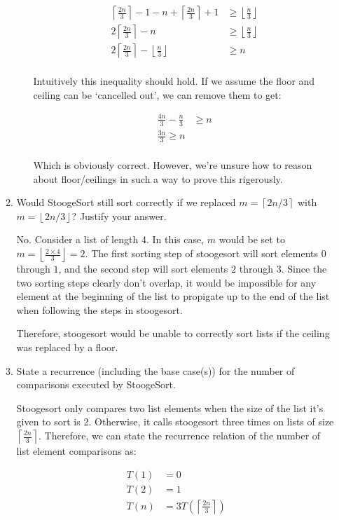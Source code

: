 \documentclass{article}
\newcommand{\ceil}[1]{\left\lceil#1\right\rceil}
\newcommand{\floor}[1]{\left\lfloor#1\right\rfloor}
\begin{document}
\begin{enumerate}
\begin{enumerate}
\begin{itemize}
  \begin{align*}
    \ceil{\frac{2n}{3}} - 1 - n + \ceil{\frac{2n}{3}} + 1 &\geq \floor{\frac{n}{3}}\\
    2\ceil{\frac{2n}{3}} - n &\geq \floor{\frac{n}{3}}\\
    2\ceil{\frac{2n}{3}} - \floor{\frac{n}{3}} &\geq n\\
  \end{align*}

  Intuitively this inequality should hold. If we assume the floor and ceiling can be `cancelled out', we can remove them to get:

  \begin{align*}
    \frac{4n}{3} - \frac{n}{3} &\geq n\\
    \frac{3n}{3} \geq n\\
  \end{align*}

  Which is obviously correct. However, we're unsure how to reason about floor/ceilings in such a way to prove this rigerously.

  \end{itemize}

    \item
    Would StoogeSort still sort correctly if we replaced $m = \ceil{2n/3}$ with $m = \floor{2n/3}$? Justify
your answer.

No. Consider a list of length 4. In this case, $m$ would be set to $m = \floor{\frac{2 \times 4}{3}} = 2$. 
The first sorting step of stoogesort will sort elements $0$ through $1$, and the second step will sort elements $2$ through $3$.
Since the two sorting steps clearly don't overlap, it would be impossible for any element at the beginning of the list to propigate up to the end of the list when following the steps in stoogesort.

Therefore, stoogesort would be unable to correctly sort lists if the ceiling was replaced by a floor.

 
    \item
    State a recurrence (including the base case(s)) for the number of comparisons executed by
StoogeSort.

Stoogesort only compares two list elements when the size of the list it's given to sort is 2. Otherwise, it calls stoogesort three times on lists of size $\ceil{\frac{2n}{3}}$. Therefore, we can state the recurrence relation of the number of list element comparisons as:

\begin{align*}
T(1) &= 0\\
T(2) &= 1\\
T(n) &= 3T(\ceil{\frac{2n}{3}})
\end{align*}


\end{enumerate}
\end{enumerate}
\end{document}
